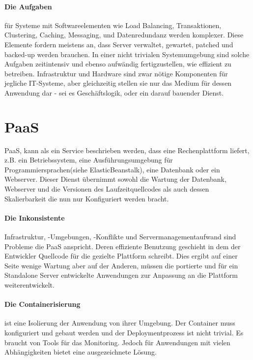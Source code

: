 \documentclass[
12pt,
english,
ngerman,
headsepline,
twoside,
openright,
numbers=noenddot,version=first
]{scrreprt}
\begin{document}
\paragraph{Die Aufgaben} für Systeme mit Softwareelementen wie Load Balancing, Transaktionen, Clustering, Caching, Messaging, und Datenredundanz werden komplexer. Diese Elemente fordern meistens an, dass Server verwaltet, gewartet, patched und backed-up werden brauchen. In einer nicht trivialen Systemumgebung sind solche Aufgaben zeitintensiv und ebenso aufwändig fertigzustellen, wie effizient zu betreiben. Infrastruktur und Hardware sind zwar nötige Komponenten für jegliche IT-Systeme, aber gleichzeitig stellen sie nur das Medium für dessen Anwendung dar - sei es Geschäftslogik, oder ein darauf bauender Dienst.

\section{PaaS}
\label{sec:paas}
\acrfull{PaaS}, kann als ein Service beschrieben werden, dass eine Rechenplattform liefert, z.B. ein Betriebssystem, eine Ausführungsumgebung für Programmiersprachen(siehe ElasticBeanstalk), eine Datenbank oder ein Webserver. Dieser Dienst übernimmt sowohl die Wartung der Datenbank, Webserver und die Versionen des Laufzeitquellcodes als auch dessen Skalierbarkeit die nun nur Konfiguriert werden bracht\cite{patternAWS}.

\paragraph{Die Inkonsistente} Infrastruktur, -Umgebungen, -Konflikte und Servermanagementaufwand sind Probleme die \acrshort{PaaS} anspricht. Deren effiziente Benutzung geschieht in dem der Entwickler Quellcode für die gezielte Plattform schreibt. Dies ergibt auf einer Seite wenige Wartung aber auf der Anderen, müssen die portierte und für ein Standalone Server entwickelte Anwendungen zur Anpassung an die Plattform weiterentwickelt.
\paragraph{Die Containerisierung}\label{par:containerisation} ist eine Isolierung der Anwendung von ihrer Umgebung. Der Container muss konfiguriert und gebaut werden und der Deploymentprozess ist nicht trivial. Es braucht von Tools für das Monitoring. Jedoch für Anwendungen mit vielen Abhängigkeiten bietet eine ausgezeichnete Lösung. 
\end{document}
